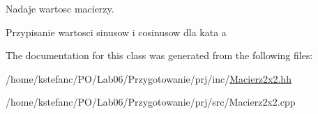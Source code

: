 Nadaje wartosc macierzy. 

Przypisanie wartosci sinusow i cosinusow dla kata a 

The documentation for this class was generated from the following files\+:\begin{DoxyCompactItemize}
\item 
/home/kstefanc/\+P\+O/\+Lab06/\+Przygotowanie/prj/inc/\hyperlink{_macierz2x2_8hh}{Macierz2x2.\+hh}\item 
/home/kstefanc/\+P\+O/\+Lab06/\+Przygotowanie/prj/src/Macierz2x2.\+cpp\end{DoxyCompactItemize}
